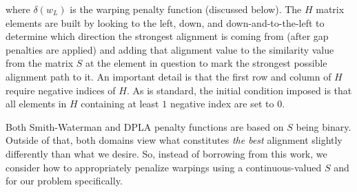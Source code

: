 \documentclass[12pt]{report} 	%
\numberwithin{figure}{chapter}
\numberwithin{table}{chapter}
\numberwithin{equation}{chapter}
\begin{document}
\begin{flushleft}
\vspace{3 mm}
\noindent  where $\delta(w_L)$ is the warping penalty function (discussed below). The $H$ matrix elements are built by looking to the left, down, and down-and-to-the-left to determine which direction the strongest alignment is coming from (after gap penalties are applied) and adding that alignment value to the similarity value from the matrix $S$ at the element in question to mark the strongest possible alignment path to it. An important detail is that the first row and column of $H$ require negative indices of $H$. As is standard, the initial condition imposed is that all elements in $H$ containing at least $1$ negative index are set to $0$.

Both Smith-Waterman and DPLA penalty functions are based on $S$ being binary. Outside of that, both domains view what constitutes \textit{the best} alignment slightly differently than what we desire. So, instead of borrowing from this work, we consider how to appropriately penalize warpings using a continuous-valued $S$ and for our problem specifically.


\end{flushleft}
\end{document}
